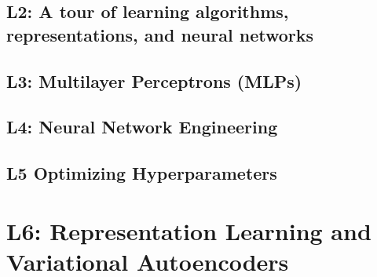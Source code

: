 \documentclass{article}
\begin{document}
\begin{definition}
    
\end{definition}

\begin{example}
    
\end{example}
\newpage

\begin{center}
    \section*{L2: A tour of learning algorithms, representations, and neural networks}
\end{center}

\newpage

\begin{center}
    \section*{L3: Multilayer Perceptrons (MLPs)}
\end{center}

\newpage

\begin{center}
    \section*{L4: Neural Network Engineering}
\end{center}

\newpage

\begin{center}
    \section{L5 Optimizing Hyperparameters}
\end{center}

\newpage

\section{L6: Representation Learning and Variational Autoencoders}

\end{document}
